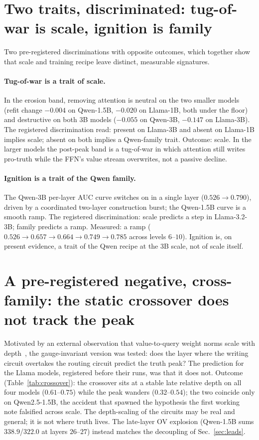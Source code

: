 \documentclass[11pt]{article}
\begin{document}
\section{Two traits, discriminated: tug-of-war is scale, ignition is family}
\label{sec:traits}

Two pre-registered discriminations with opposite outcomes, which together
show that scale and training recipe leave distinct, measurable signatures.

\paragraph{Tug-of-war is a trait of scale.} In the erosion band, removing
attention is neutral on the two smaller models (refit change $-0.004$ on
Qwen-1.5B, $-0.020$ on Llama-1B, both under the floor) and destructive on
both 3B models ($-0.055$ on Qwen-3B, $-0.147$ on Llama-3B). The registered
discrimination read: present on Llama-3B and absent on Llama-1B implies
scale; absent on both implies a Qwen-family trait. Outcome: scale. In the
larger models the post-peak band is a tug-of-war in which attention still
writes pro-truth while the FFN's value stream overwrites, not a passive
decline.

\paragraph{Ignition is a trait of the Qwen family.} The Qwen-3B per-layer
AUC curve switches on in a single layer ($0.526 \to 0.790$), driven by a
coordinated two-layer construction burst; the Qwen-1.5B curve is a smooth
ramp. The registered discrimination: scale predicts a step in Llama-3.2-3B;
family predicts a ramp. Measured: a ramp ($0.526 \to 0.657 \to 0.664 \to
0.749 \to 0.785$ across levels $6$--$10$). Ignition is, on present
evidence, a trait of the Qwen recipe at the 3B scale, not of scale itself.

\section{A pre-registered negative, cross-family: the static crossover does not track the peak}
\label{sec:negatives}

Motivated by an external observation that value-to-query weight norms scale
with depth~\cite{headgenome}, the gauge-invariant version was tested: does
the layer where the writing circuit overtakes the routing circuit predict
the truth peak? The prediction for the Llama models, registered before
their runs, was that it does not. Outcome (Table~\ref{tab:crossover}): the
crossover sits at a stable late relative depth on all four models
($0.61$--$0.75$) while the peak wanders ($0.32$--$0.54$); the two coincide
only on Qwen2.5-1.5B, the accident that spawned the hypothesis the first
working note falsified across scale. The depth-scaling of the circuits may
be real and general; it is not where truth lives. The late-layer OV
explosion (Qwen-1.5B sums $338.9$/$322.0$ at layers $26$--$27$) instead
matches the decoupling of Sec.~\ref{sec:leads}.
\end{document}
